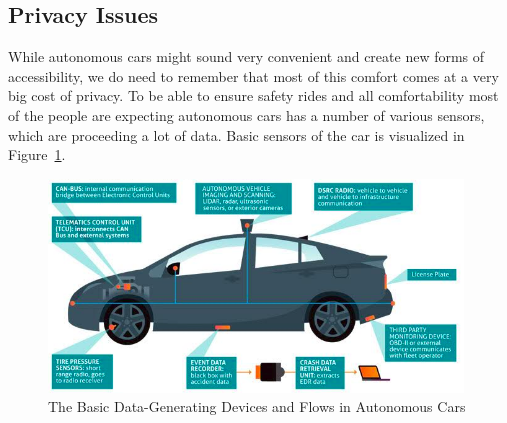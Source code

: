 \subsection{Privacy Issues}

While autonomous cars might sound very convenient and create new forms of accessibility, we do need to remember that most of this comfort comes at a very big cost of privacy. To be able to ensure safety rides and all comfortability most of the people are expecting autonomous cars has a number of various sensors, which are proceeding a lot of data. Basic sensors of the car is visualized in Figure~\ref{fig:Sensors}. \\ 

\begin{figure}[H]
	\centering  	
	\includegraphics[width=11cm]{img/Sensors1.png}
	\caption{The Basic Data-Generating Devices and Flows in Autonomous Cars \cite{PicPrivacy}}
	\label{fig:Sensors}    
\end{figure}

